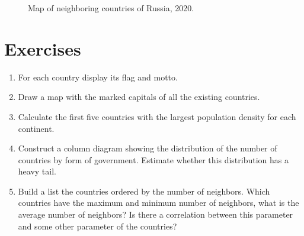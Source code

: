 \begin{figure}
	{
		\setlength{\fboxsep}{0pt}%
		\setlength{\fboxrule}{1pt}%
	}
	\caption{Map of neighboring countries of Russia, 2020.
	}%
	\label{fig:neighboring_countries_ru}%
\end{figure}
\section{Exercises}
\begin{enumerate}
	\item For each country display its flag and motto.
	\item Draw a map with the marked capitals of all the existing countries.
	\item Calculate the first five countries with the largest population density for each continent.
	\item Construct a column diagram showing the distribution of the number of countries by form of government. Estimate whether this distribution has a heavy tail.
	\item Build a list the countries ordered by the number of neighbors. Which countries have the maximum and minimum number of neighbors, what is the average number of neighbors? Is there a correlation between this parameter and some other parameter of the countries?
\end{enumerate}
